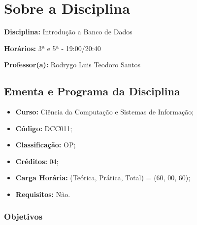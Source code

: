 \documentclass[12pt, a4paper]{article}
\begin{document}
\maketitle

\section{Sobre a Disciplina} \label{sec:disciplina}


\textbf{Disciplina:} Introdução a Banco de Dados

\textbf{Horários:} 3ª e 5ª - 19:00/20:40

\textbf{Professor(a):} Rodrygo Luis Teodoro Santos




\subsection{Ementa e Programa da Disciplina} \label{subsec:ementa_e_programa}


\begin{itemize}
    \item \textbf{Curso:} Ciência da Computação e Sistemas de Informação;
    \item \textbf{Código:} DCC011;
    \item \textbf{Classificação:} OP;
    \item \textbf{Créditos:} 04;
    \item \textbf{Carga Horária:} (Teórica, Prática, Total) = (60, 00, 60);
    \item \textbf{Requisitos:} Não.
\end{itemize}

\subsubsection{Objetivos} \label{subsubsec:objetivos}
\end{document}
